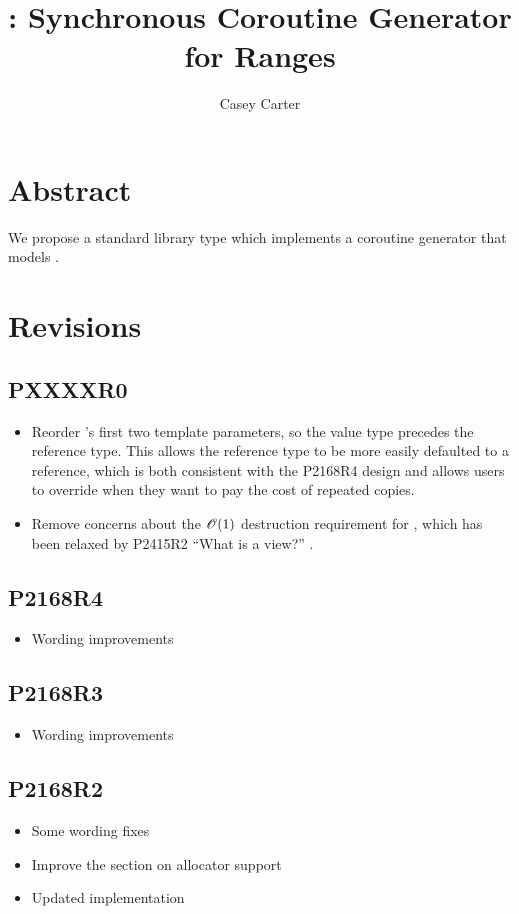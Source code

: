 \documentclass{wg21}
\title{\tcode{std::generator}: Synchronous Coroutine Generator for Ranges}
\author{Casey Carter}{Casey@Carter.net}
\begin{document}
\maketitle


\section{Abstract}

We propose a standard library type 
which implements a coroutine generator
that models .


\section{Revisions}

\subsection{PXXXXR0}
\begin{itemize}
\item Reorder 's first two template parameters,
  so the value type precedes the reference type.
  This allows the reference type to be more easily defaulted to a reference,
  which is both consistent with the P2168R4 design and allows
  users to override when they want to pay the cost of repeated copies.

\item Remove concerns about the $\mathscr{O}(1)$ destruction requirement for ,
  which has been relaxed by P2415R2 ``What is a view?'' \cite{P2415R2}.
\end{itemize}

\subsection{P2168R4}
\begin{itemize}
\item Wording improvements
\end{itemize}

\subsection{P2168R3}
\begin{itemize}
\item Wording improvements
\end{itemize}

\subsection{P2168R2}
\begin{itemize}
\item Some wording fixes
\item Improve the section on allocator support
\item Updated implementation
\end{itemize}
\end{document}
